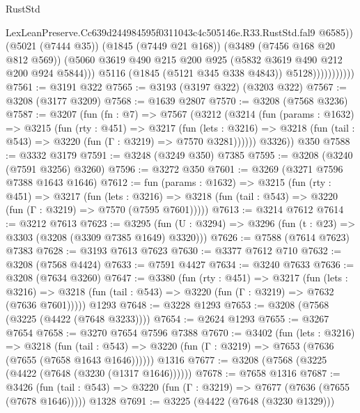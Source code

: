 \begin{lexlean}{RustStd}
\begin{coremodule}
                                LexLeanPreserve.Cc639d244984595f0311043c4c505146e.R33.RustStd.fal9
                                @6585))
                            (@5021 (@7444 @35))
                            (@1845 (@7449 @21 @168))
                            (@3489 (@7456 @168 @20 @812 @569))
                            (@5060
                              @3619
                              @490
                              @215
                              @200
                              @925
                              (@5832 @3619 @490 @212 @200 @924 @5844)))
                          @5116
                          (@1845 (@5121 @345 @338 @4843))
                          @5128)))))))))))
@7561 := @3191 @322
@7565 := @3193 (@3197 @322) (@3203 @322)
@7567 := @3208 (@3177 @3209)
@7568 := @1639 @2807
@7570 := @3208 (@7568 @3236)
@7587 := @3207
    (fun (fn : @7) =>
    @7567
      (@3212
        (@3214
          (fun (params : @1632) =>
          @3215
            (fun (rty : @451) =>
            @3217
              (fun (lets : @3216) =>
              @3218 (fun (tail : @543) => @3220 (fun (Γ : @3219) => @7570 @3281))))))
        @3326))
    @350
@7588 := @3332 @3179
@7591 := @3248 (@3249 @350) @7385
@7595 := @3208 (@3240 (@7591 @3256) @3260)
@7596 := @3272 @350
@7601 := @3269 (@3271 @7596 @7388 @1643 @1646)
@7612 := fun (params : @1632) =>
  @3215
    (fun (rty : @451) =>
    @3217
      (fun (lets : @3216) =>
      @3218 (fun (tail : @543) => @3220 (fun (Γ : @3219) => @7570 (@7595 @7601)))))
@7613 := @3214 @7612
@7614 := @3212 @7613
@7623 := @3295 (fun (U : @3294) => @3296 (fun (t : @23) => @3303 (@3208 (@3309 @7385 @1649) @3320)))
@7626 := @7588 (@7614 @7623) @7383
@7628 := @3193 @7613 @7623
@7630 := @3377 @7612 @710
@7632 := @3208 (@7568 @4424)
@7633 := @7591 @4427
@7634 := @3240 @7633
@7636 := @3208 (@7634 @3260)
@7647 := @3380
    (fun (rty : @451) =>
    @3217
      (fun (lets : @3216) =>
      @3218 (fun (tail : @543) => @3220 (fun (Γ : @3219) => @7632 (@7636 @7601)))))
    @1293
@7648 := @3228 @1293
@7653 := @3208 (@7568 (@3225 (@4422 (@7648 @3233))))
@7654 := @2624 @1293
@7655 := @3267 @7654
@7658 := @3270 @7654 @7596 @7388
@7670 := @3402
    (fun (lets : @3216) =>
    @3218
      (fun (tail : @543) => @3220 (fun (Γ : @3219) => @7653 (@7636 (@7655 (@7658 @1643 @1646))))))
    @1316
@7677 := @3208 (@7568 (@3225 (@4422 (@7648 (@3230 (@1317 @1646))))))
@7678 := @7658 @1316
@7687 := @3426
    (fun (tail : @543) => @3220 (fun (Γ : @3219) => @7677 (@7636 (@7655 (@7678 @1646)))))
    @1328
@7691 := @3225 (@4422 (@7648 (@3230 @1329)))

\end{coremodule}
\end{lexlean}
